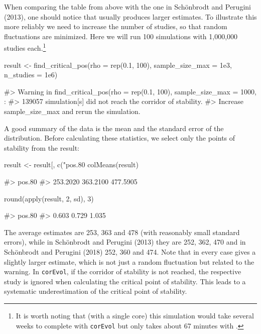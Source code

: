 When comparing the table from above with the one in Schönbrodt and Perugini (2013), one should notice that  usually produces larger estimates. To illustrate this more reliably we need to increase the number of studies, so that random fluctuations are minimized. Here we will run 100 simulations with 1,000,000 studies each.\footnote{It is worth noting that (with a single core) this simulation would take several weeks to complete with \texttt{corEvol} but only takes about 67 minutes with .}

\begin{Schunk}
\begin{Sinput}
result <- find_critical_pos(rho = rep(0.1, 100), sample_size_max = 1e3,
                            n_studies = 1e6)
\end{Sinput}
\begin{Soutput}
#> Warning in find_critical_pos(rho = rep(0.1, 100), sample_size_max = 1000, : 
#> 139057 simulation[s] did not reach the corridor of stability.
#> Increase sample_size_max and rerun the simulation.
\end{Soutput}
\end{Schunk}

A good summary of the data is the mean and the standard error of the distribution. Before calculating these statistics, we select only the points of stability from the result:

\begin{Schunk}
\begin{Sinput}
result <- result[, c("pos.80%", "pos.90%", "pos.95%")]
colMeans(result)
\end{Sinput}
\begin{Soutput}
#>  pos.80%  pos.90%  pos.95% 
#> 253.2020 363.2100 477.5905
\end{Soutput}
\begin{Sinput}
round(apply(result, 2, sd), 3)
\end{Sinput}
\begin{Soutput}
#> pos.80% pos.90% pos.95% 
#>   0.603   0.729   1.035
\end{Soutput}
\end{Schunk}

The average estimates are 253, 363 and 478 (with reasonably small standard errors), while in Schönbrodt and Perugini (2013) they are 252, 362, 470 and in Schönbrodt and Perugini (2018) 252, 360 and 474. Note that in every case  gives a slightly larger estimate, which is not just a random fluctuation but related to the warning. In \texttt{corEvol}, if the corridor of stability is not reached, the respective study is ignored when calculating the critical point of stability. This leads to a systematic underestimation of the critical point of stability.

